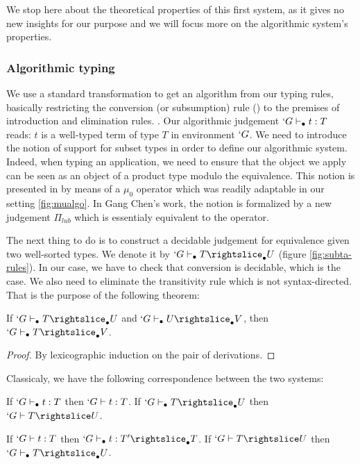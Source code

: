 \documentclass[twocolumn]{article}
\begin{document}
We stop here about the theoretical properties of this first system, as
it gives no new insights for our purpose and we will focus more on the
algorithmic system's properties.

\subsubsection{Algorithmic typing}
We use a standard transformation to get an algorithm from our typing
rules, basically restricting the conversion (or subsumption) rule
() to the premises of introduction and elimination rules.
. Our algorithmic judgement $`G \vdash_{\bullet} t : T$
reads: $t$ is a well-typed term of type $T$ in environment $`G$.
We need to introduce the notion of support for subset types in order to
define our algorithmic system. Indeed, when typing an application, 
we need to ensure that the object we apply can be seen as an object of a
product type modulo the equivalence. This notion is presented in \PVS{} by
means of a $\mu_0$ operator which was readily adaptable in our setting
\ref{fig:mualgo}. In Gang Chen's work, the notion is formalized by a
new judgement $\Pi_{lub}$ which is essentialy equivalent to the operator.

The next thing to do is to construct a decidable judgement for
equivalence given two well-sorted types. We denote it by $`G \typea T
\suba U$ (figure \ref{fig:subta-rules}).
In our case, we have to check that conversion is decidable, which is the
case. We also need to eliminate the transitivity rule which is not
syntax-directed. That is the purpose of the following theorem:
\begin{theorem}
  If $`G \typea T \suba U$ and $`G \typea U \suba V$, then $`G \typea T
  \suba V$.
\end{theorem}
\begin{proof}
  By lexicographic induction on the pair of derivations.
\end{proof}

Classicaly, we have the following correspondence between the two
systems:
\begin{theorem}[Soundness]
  If $`G \vdash_{\bullet} t : T$ then $`G \vdash t : T$.
  If $`G \typea T \suba U$ then $`G \typed T \subd U$.
\end{theorem}

\begin{theorem}[Completeness]
  If $`G \vdash t : T$ then $`G \typea t : T' \suba T$.
  If $`G \typed T \subd U$ then $`G \typea T \suba U$.
\end{theorem}
\end{document}
